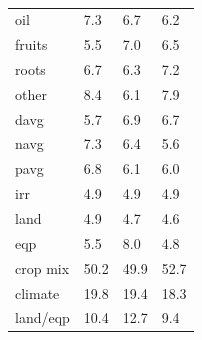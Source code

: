 \documentclass[11pt]{article}
\begin{document}
\begin{table}[h!]
{\begin{tabular}{llll}
oil & 7.3 & 6.7 & 6.2 \\
fruits & 5.5 & 7.0 & 6.5 \\
roots & 6.7 & 6.3 & 7.2 \\
other & 8.4 & 6.1 & 7.9 \\
davg & 5.7 & 6.9 & 6.7 \\
navg & 7.3 & 6.4 & 5.6 \\
pavg & 6.8 & 6.1 & 6.0 \\
irr & 4.9 & 4.9 & 4.9 \\
land & 4.9 & 4.7 & 4.6 \\
eqp & 5.5 & 8.0 & 4.8 \\
\midrule
crop mix & 50.2 & 49.9 & 52.7 \\
climate & 19.8 & 19.4 & 18.3 \\
land/eqp & 10.4 & 12.7 & 9.4 \\
\bottomrule
\end{tabular}
\caption{ }
\label{t.ny.trop_percentages}
}
\end{table}
\end{document}
